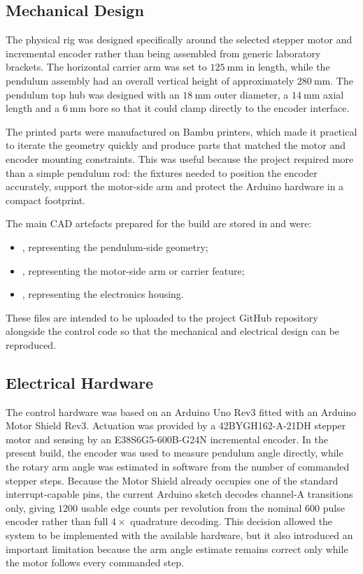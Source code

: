 \documentclass[conference]{IEEEtran}
\begin{document}
\subsection{Mechanical Design}
The physical rig was designed specifically around the selected stepper motor and incremental encoder rather than being assembled from generic laboratory brackets. The horizontal carrier arm was set to $125~\mathrm{mm}$ in length, while the pendulum assembly had an overall vertical height of approximately $280~\mathrm{mm}$. The pendulum top hub was designed with an $18~\mathrm{mm}$ outer diameter, a $14~\mathrm{mm}$ axial length and a $6~\mathrm{mm}$ bore so that it could clamp directly to the encoder interface.

The printed parts were manufactured on Bambu printers, which made it practical to iterate the geometry quickly and produce parts that matched the motor and encoder mounting constraints. This was useful because the project required more than a simple pendulum rod: the fixtures needed to position the encoder accurately, support the motor-side arm and protect the Arduino hardware in a compact footprint.

The main CAD artefacts prepared for the build are stored in  and were:
\begin{itemize}
\item {}, representing the pendulum-side geometry;
\item {}, representing the motor-side arm or carrier feature;
\item {}, representing the electronics housing.
\end{itemize}

These files are intended to be uploaded to the project GitHub repository alongside the control code so that the mechanical and electrical design can be reproduced.

\subsection{Electrical Hardware}
The control hardware was based on an Arduino Uno Rev3 fitted with an Arduino Motor Shield Rev3. Actuation was provided by a 42BYGH162-A-21DH stepper motor and sensing by an E38S6G5-600B-G24N incremental encoder. In the present build, the encoder was used to measure pendulum angle directly, while the rotary arm angle was estimated in software from the number of commanded stepper steps. Because the Motor Shield already occupies one of the standard interrupt-capable pins, the current Arduino sketch decodes channel-A transitions only, giving $1200$ usable edge counts per revolution from the nominal $600$ pulse encoder rather than full $4\times$ quadrature decoding. This decision allowed the system to be implemented with the available hardware, but it also introduced an important limitation because the arm angle estimate remains correct only while the motor follows every commanded step.
\end{document}
